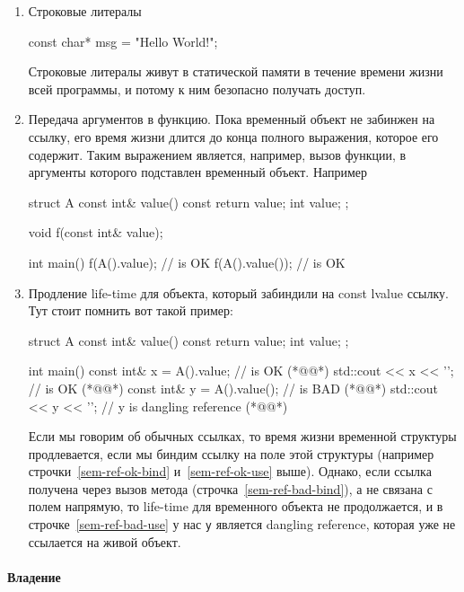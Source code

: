 \begin{enumerate}
\item Строковые литералы
\begin{cppcode}
const char* msg = "Hello World!";
\end{cppcode}
Строковые литералы живут в статической памяти в течение времени жизни всей программы, и потому к ним безопасно получать доступ.

\item Передача аргументов в функцию.
Пока временный объект не забинжен на ссылку, его время жизни длится до конца полного выражения, которое его содержит.
Таким выражением является, например, вызов функции, в аргументы которого подставлен временный объект.
Например
\begin{cppcode}
struct A {
  const int& value() const {
    return value;
  }
  int value;
};

void f(const int& value);

int main() {
  f(A().value); // is OK
  f(A().value()); // is OK
}
\end{cppcode}

\item Продление life-time для объекта, который забиндили на const lvalue ссылку.
Тут стоит помнить вот такой пример:
\begin{cppcode}
struct A {
  const int& value() const {
    return value;
  }
  int value;
};

int main() {
  const int& x = A().value; // is OK (*@@*)
  std::cout << x << '\n'; // is OK (*@@*)
  const int& y = A().value(); // is BAD (*@@*)
  std::cout << y << '\n'; // y is dangling reference (*@@*)
}
\end{cppcode}
Если мы говорим об обычных ссылках, то время жизни временной структуры продлевается, если мы биндим ссылку на поле этой структуры (например строчки~\ref{sem-ref-ok-bind} и~\ref{sem-ref-ok-use} выше).
Однако, если ссылка получена через вызов метода (строчка~\ref{sem-ref-bad-bind}), а не связана с полем напрямую, то life-time для временного объекта не продолжается, и в строчке~\ref{sem-ref-bad-use} у нас \verb"y" является dangling reference, которая уже не ссылается на живой объект.
\end{enumerate}

\paragraph{Владение}

